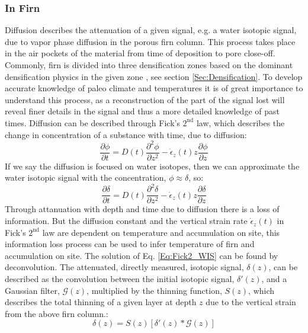 \documentclass[../../CompleteThesis/Complete_1stDraft.tex]{subfiles}
\begin{document}
\subsubsection{In Firn}
\label{Subsubsec:Ice_DiffusionAndDensification_Diffusion_Firn}
Diffusion describes the attenuation of a given signal, e.g. a water isotopic signal, due to vapor phase diffusion in the porous firn column. This process takes place in the air pockets of the material from time of deposition to pore close-off. Commonly, firn is divided into three densification zones based on the dominant densification physics in the given zone \cite[Herron and Langway, 1980]{HerronLangway1980}, see section \ref{Sec:Densification}.
To develop accurate knowledge of paleo climate and temperatures it is of great importance to understand this process, as a reconstruction of the part of the signal lost will reveal finer details in the signal and thus a more detailed knowledge of past times. 
Diffusion can be described through Fick's $2^{\text{nd}}$ law, which describes the change in concentration of a substance with time, due to diffusion:
\begin{equation}
	\frac{\partial \phi}{\partial t} = D(t) \frac{\partial^2 \phi}{\partial z^2} - \dot{\epsilon}_z(t) z \frac{\partial \phi}{\partial z}
	\label{Eq:Fick2_concentration}
\end{equation}
If we say the diffusion is focused on water isotopes, then we can approximate the water isotopic signal with the concentration, $\phi \approx \delta$, so:
\begin{equation}
	\frac{\partial \delta}{\partial t} = D(t) \frac{\partial^2 \delta}{\partial z^2} - \dot{\epsilon}_z(t) z \frac{\partial \delta}{\partial z}
	\label{Eq:Fick2_WIS}
\end{equation}
Through attanuation with depth and time due to diffusion there is a loss of information. But the diffusion constant and the vertical strain rate $\dot{\epsilon}_z(t)$ in Fick's $2^{\text{nd}}$ law are dependent on temperature and accumulation on site, this information loss process can be used to infer temperature of firn and accumulation on site. 
The solution of Eq. \ref{Eq:Fick2_WIS} can be found by deconvolution. The attenuated, directly measured, isotopic signal, $\delta(z)$, can be described as the convolution between the initial isotopic signal, $\delta '(z)$, and a Gaussian filter, $\mathcal{G}(z)$, multiplied by the thinning function, $S(z)$, which describes the total thinning of a given layer at depth $z$ due to the vertical strain from the above firn column.:
\begin{equation}
	\delta(z) = S(z)[\delta'(z)*\mathcal{G}(z)]
	\label{Eq:diff_solution_conv}
\end{equation}
\end{document}
